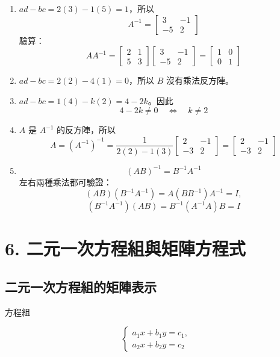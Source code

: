\documentclass[11pt,a4paper]{article}
\begin{document}
\begin{enumerate}
\def\labelenumi{\arabic{enumi}.}
\item
  \(ad-bc=2(3)-1(5)=1\)，所以
  \[A^{-1}=\begin{bmatrix}3&-1\\-5&2\end{bmatrix}\]
  驗算：
  \[
  AA^{-1}=
  \begin{bmatrix}2&1\\5&3\end{bmatrix}
  \begin{bmatrix}3&-1\\-5&2\end{bmatrix}
  =\begin{bmatrix}1&0\\0&1\end{bmatrix}
  \]
\item
  \(ad-bc=2(2)-4(1)=0\)，所以 \(B\) 沒有乘法反方陣。
\item
  \(ad-bc=1(4)-k(2)=4-2k\)。因此
  \[4-2k\ne0\quad\Longleftrightarrow\quad k\ne2\]
\item
  \(A\) 是 \(A^{-1}\) 的反方陣，所以
  \[
  A=(A^{-1})^{-1}
  =\frac{1}{2(2)-1(3)}
  \begin{bmatrix}2&-1\\-3&2\end{bmatrix}
  =\begin{bmatrix}2&-1\\-3&2\end{bmatrix}
  \]
\item
  \[
   (AB)^{-1}=B^{-1}A^{-1}
   \]
  左右兩種乘法都可驗證：
  \[
   (AB)(B^{-1}A^{-1})=A(BB^{-1})A^{-1}=I,
   \]
  \[
   (B^{-1}A^{-1})(AB)=B^{-1}(A^{-1}A)B=I
   \]
\end{enumerate}

\section{6. 二元一次方程組與矩陣方程式}\label{ux4e8cux5143ux4e00ux6b21ux65b9ux7a0bux7d44ux8207ux77e9ux9663ux65b9ux7a0bux5f0f}

\subsection{二元一次方程組的矩陣表示}\label{ux4e8cux5143ux4e00ux6b21ux65b9ux7a0bux7d44ux7684ux77e9ux9663ux8868ux793a}

方程組

\[
\begin{cases}
a_1x+b_1y=c_1,\\
a_2x+b_2y=c_2
\end{cases}
\]
\end{document}
